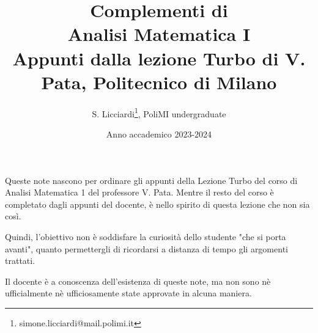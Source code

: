 \documentclass[a4paper,12pt]{report}
\author{S. Licciardi\thanks{simone.licciardi@mail.polimi.it}, PoliMI undergraduate}
\date{\large Anno accademico 2023-2024}
\title
{
	\large Complementi di\\
	\LARGE \textbf{Analisi Matematica I} \\[.4\baselineskip]
	\large Appunti dalla lezione Turbo di V. Pata, Politecnico di Milano
}
\begin{document}
\maketitle
\tableofcontents

\par\vspace{2cm}Queste note nascono per ordinare gli appunti della Lezione Turbo del corso di Analisi Matematica 1 del professore V. Pata. 
Mentre il resto del corso è completato dagli appunti del docente, è nello spirito di questa lezione che non sia così.

Quindi, l'obiettivo non è soddisfare la curiosità dello studente "che si porta avanti", quanto permettergli di ricordarsi a distanza di tempo gli argomenti trattati.

Il docente è a conoscenza dell'esistenza di queste note, ma non sono nè ufficialmente nè ufficiosamente state approvate in alcuna maniera.

\newpage






\end{document}
